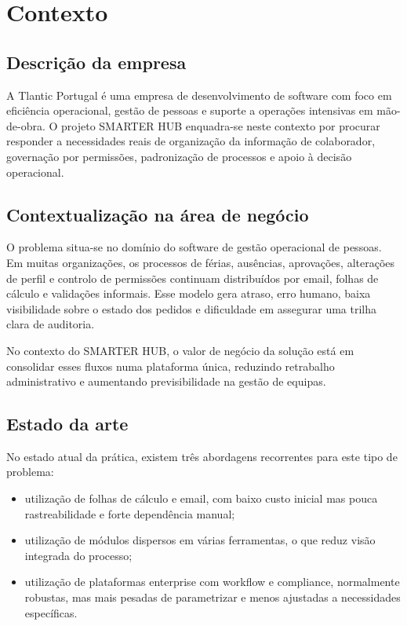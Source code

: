 \documentclass[11pt,a4paper,twoside]{article}
\begin{document}
\section{Contexto}

\subsection{Descrição da empresa}

A Tlantic Portugal é uma empresa de desenvolvimento de software com foco em eficiência operacional, gestão de pessoas e suporte a operações intensivas em mão-de-obra. O projeto SMARTER HUB enquadra-se neste contexto por procurar responder a necessidades reais de organização da informação de colaborador, governação por permissões, padronização de processos e apoio à decisão operacional.

\subsection{Contextualização na área de negócio}

O problema situa-se no domínio do software de gestão operacional de pessoas. Em muitas organizações, os processos de férias, ausências, aprovações, alterações de perfil e controlo de permissões continuam distribuídos por email, folhas de cálculo e validações informais. Esse modelo gera atraso, erro humano, baixa visibilidade sobre o estado dos pedidos e dificuldade em assegurar uma trilha clara de auditoria.

No contexto do SMARTER HUB, o valor de negócio da solução está em consolidar esses fluxos numa plataforma única, reduzindo retrabalho administrativo e aumentando previsibilidade na gestão de equipas.

\subsection{Estado da arte}

No estado atual da prática, existem três abordagens recorrentes para este tipo de problema:

\begin{itemize}
  \item utilização de folhas de cálculo e email, com baixo custo inicial mas pouca rastreabilidade e forte dependência manual;
  \item utilização de módulos dispersos em várias ferramentas, o que reduz visão integrada do processo;
  \item utilização de plataformas enterprise com workflow e compliance, normalmente robustas, mas mais pesadas de parametrizar e menos ajustadas a necessidades específicas.
\end{itemize}
\end{document}
